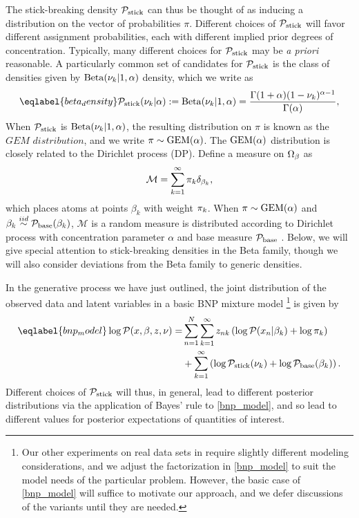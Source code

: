 The stick-breaking density $\mathcal{P}_{\mathrm{stick}}$ can thus be thought of as inducing a
distribution on the vector of probabilities $\pi$.  Different choices of
$\mathcal{P}_{\mathrm{stick}}$ will favor different assignment probabilities, each with different
implied prior degrees of concentration.
%
Typically, many different choices for $\mathcal{P}_{\mathrm{stick}}$ may be {\em a priori}
reasonable.  A particularly common set of candidates for $\mathcal{P}_{\mathrm{stick}}$ is the class
of densities given by $\mathrm{Beta}(\nu_{k} \vert 1, \alpha)$ density, which we
write as
%
\begin{align}\eqlabel{beta_density}
%
\pstick(\nuk \vert \alpha) :=
\mathrm{Beta}(\nuk \vert 1, \alpha) =
    \frac{\Gamma(1 + \alpha) (1 - \nuk)^{\alpha - 1}}
         {\Gamma(\alpha)},
%
\end{align}
%
When $\mathcal{P}_{\mathrm{stick}}$ is $\mathrm{Beta}(\nu_{k} \vert 1, \alpha)$, the resulting
distribution on $\pi$ is known as the $\textit{GEM distribution}$, and we write
$\pi \sim \mathrm{GEM}(\alpha)$.
%
The $\mathrm{GEM}(\alpha)$ distribution is closely related to the Dirichlet process (DP).
Define a measure on $\Omega_{\beta}$ as
%
\begin{align*}
  \mathcal{M} = \sum_{k = 1}^\infty \pi_k\delta_{\beta_k},
\end{align*}
%
which places atoms at points $\beta_k$ with weight $\pi_k$. When $\pi \sim
\mathrm{GEM}(\alpha)$ and $\beta_k \overset{iid}{\sim} \mathcal{P}_{\mathrm{base}}(\beta_k)$, $\mathcal{M}$
is a random measure is distributed according to Dirichlet process with
concentration parameter $\alpha$ and base measure $\mathcal{P}_{\mathrm{base}}$
\citep{ferguson:1973:bayesian, sethuraman:1994:constructivedp}. Below, we will
give special attention to stick-breaking densities in the Beta family, though we
will also consider deviations from the Beta family to generic densities.

In the generative process we have just outlined, the joint distribution of the
observed data and latent variables in a basic BNP mixture model
%
\footnote{ Our other experiments on real data sets in  require slightly different modeling considerations, and we
adjust the factorization in \eqref{bnp_model} to suit the model needs of the
particular problem.  However, the basic case of \eqref{bnp_model} will suffice
to motivate our approach, and we defer discussions of the variants until they
are needed.}
%
is given by
%
\begin{align}\eqlabel{bnp_model}
%
\logp(\x, \beta, \z, \nu) =&
\sum_{n=1}^N \sum_{k=1}^{\infty}
    \z_{\n\k} \left(
        \logp(\x_n \vert \beta_\k) + \log \pi_\k
    \right)
\nonumber\\
   & +
    \sum_{k=1}^{\infty} \left(
        \log \pstick(\nuk) + \log \pbetaprior(\beta_\k)
    \right).
%
\end{align}
%
Different choices of $\mathcal{P}_{\mathrm{stick}}$ will thus, in general, lead to different
posterior distributions via the application of Bayes' rule to \eqref{bnp_model},
and so lead to different values for posterior expectations of quantities of
interest.

